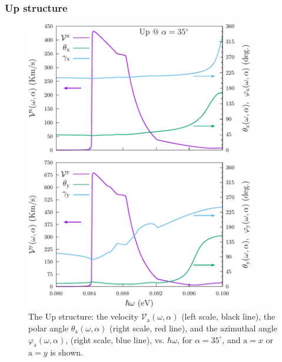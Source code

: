 \documentclass[floatfix,prb,aps,superscriptaddress,showpacs,11pt,preprint,letterpaper]{revtex4}
\def\tama{10cm}
\begin{document}
\subsubsection{Up structure}

\begin{figure}[t]
\centering
\includegraphics[width=\tama]{figures/fig7}
\caption{The Up structure: the velocity $\mathcal{V}_{\mathrm{a}}
(\omega,\alpha)$ (left scale, black line), the polar angle $\theta_{\mathrm{a}}
(\omega,\alpha)$ (right scale, red line), and  the azimuthal angle
$\varphi_{\mathrm{a}} (\omega,\alpha)$, (right scale, blue line), vs.
$\hbar\omega$, for $\alpha=35^\circ$, and $\mathrm{a}=x$ or $\mathrm{a}=y$ is
shown. }
\label{fig:up-vab-comp-rtp-1}
\end{figure}
\end{document}
